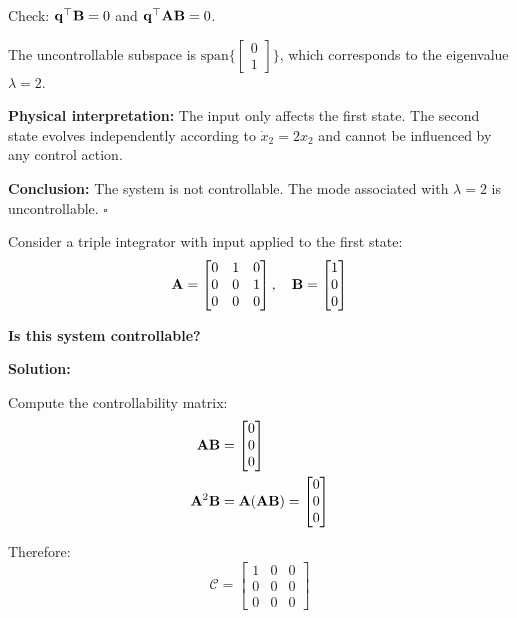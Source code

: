 \begin{examplebox}
Check: $\mathbf{q}^\top\mathbf{B} = 0$ and $\mathbf{q}^\top\mathbf{A}\mathbf{B} = 0$. \checkmark

The uncontrollable subspace is $\text{span}\{\begin{bmatrix} 0 \\ 1 \end{bmatrix}\}$, which corresponds to the eigenvalue $\lambda = 2$.

\textbf{Physical interpretation:} The input only affects the first state. The second state evolves independently according to $\dot{x}_2 = 2x_2$ and cannot be influenced by any control action.

\textbf{Conclusion:} The system is not controllable. The mode associated with $\lambda = 2$ is uncontrollable. \hfill $\square$
\end{examplebox}

\begin{example}
\label{ex:third_order}
Consider a triple integrator with input applied to the first state:
\begin{equation}
\mathbf{A} = \begin{bmatrix} 0 & 1 & 0 \\ 0 & 0 & 1 \\ 0 & 0 & 0 \end{bmatrix}, \quad
\mathbf{B} = \begin{bmatrix} 1 \\ 0 \\ 0 \end{bmatrix}
\end{equation}

\textbf{Is this system controllable?}

\textbf{Solution:}

Compute the controllability matrix:
\begin{align}
\mathbf{A}\mathbf{B} &= \begin{bmatrix} 0 \\ 0 \\ 0 \end{bmatrix} \\
\mathbf{A}^2\mathbf{B} &= \mathbf{A}(\mathbf{A}\mathbf{B}) = \begin{bmatrix} 0 \\ 0 \\ 0 \end{bmatrix}
\end{align}

Therefore:
\begin{equation}
\mathcal{C} = \begin{bmatrix} 1 & 0 & 0 \\ 0 & 0 & 0 \\ 0 & 0 & 0 \end{bmatrix}
\end{equation}


\end{example}
